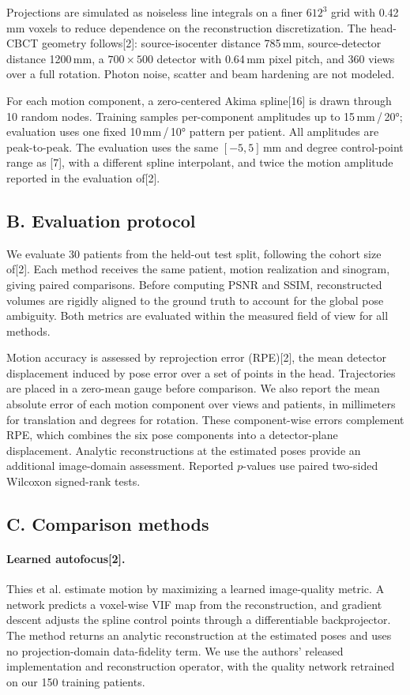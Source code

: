\documentclass[11pt]{article}
\begin{document}
Projections are simulated as noiseless line integrals on a finer $612^3$ grid with
0.42\,mm voxels to reduce dependence on the reconstruction discretization. The
head-CBCT geometry follows[2]: source-isocenter distance 785\,mm,
source-detector distance 1200\,mm, a $700\times500$ detector with 0.64\,mm pixel
pitch, and 360 views over a full rotation. Photon noise, scatter and beam hardening
are not modeled.

For each motion component, a zero-centered Akima spline[16] is drawn through
10 random nodes. Training samples per-component amplitudes up to
15\,mm\,/\,20°; evaluation uses one fixed
10\,mm\,/\,10° pattern per patient. All amplitudes are peak-to-peak.
The evaluation uses the same $[-5,5]$\,mm and degree control-point range as
[7], with a different spline interpolant, and twice the motion amplitude
reported in the evaluation of[2].

\subsection{B. Evaluation protocol}


We evaluate 30 patients from the held-out test split, following the cohort size
of[2]. Each method receives the same patient, motion realization and
sinogram, giving paired comparisons. Before computing PSNR and SSIM, reconstructed
volumes are rigidly aligned to the ground truth to account for the global pose
ambiguity. Both metrics are evaluated within the measured field of view for all methods.

Motion accuracy is assessed by reprojection error (RPE)[2], the mean
detector displacement induced by pose error over a set of points in the head.
Trajectories are placed in a zero-mean gauge before comparison. We also report the
mean absolute error of each motion component over views and patients, in millimeters
for translation and degrees for rotation. These component-wise errors complement RPE,
which combines the six pose components into a detector-plane displacement.
Analytic reconstructions at the estimated poses provide an additional image-domain
assessment. Reported $p$-values use paired two-sided Wilcoxon signed-rank tests.

\subsection{C. Comparison methods}


\paragraph{Learned autofocus[2].}
Thies et al. estimate motion by maximizing a learned image-quality metric. A network
predicts a voxel-wise VIF map from the reconstruction, and gradient descent adjusts
the spline control points through a differentiable backprojector. The method returns
an analytic reconstruction at the estimated poses and uses no projection-domain
data-fidelity term. We use the authors' released implementation and reconstruction
operator, with the quality network retrained on our 150 training patients.
\end{document}
